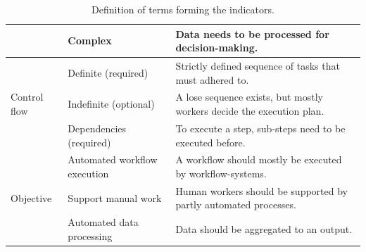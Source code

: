 \begin{table}[]
{\begin{tabular}{@{}lll@{}}
                                              & Complex                                                                                      & Data needs to be processed for decision-making.                                                                                    \\ \midrule
\multirow{3}{*}{Control flow}                 & Definite (required)                                                                          & Strictly defined sequence of tasks that must adhered to.                                                                           \\ \cmidrule(l){2-3} 
                                              & Indefinite (optional)                                                                        & A lose sequence exists, but mostly workers decide the execution plan.                                                              \\ \cmidrule(l){2-3} 
                                              & Dependencies (required)                                                                      & To execute a step, sub-steps need to be executed before.                                                                           \\ \midrule
\multirow{3}{*}{Objective}                    & Automated workflow execution                                                                 & A workflow should mostly be executed by workflow-systems.                                                                          \\ \cmidrule(l){2-3} 
                                              & Support manual work                                                                          & Human workers should be supported by partly automated processes.                                                                   \\ \cmidrule(l){2-3} 
                                              & Automated data processing                                                                    & Data should be aggregated to an output.                                                                                            \\ \bottomrule
\end{tabular}%
}
\caption{Definition of terms forming the indicators.}
\label{tab:indicators_terms_definition}
\end{table}

